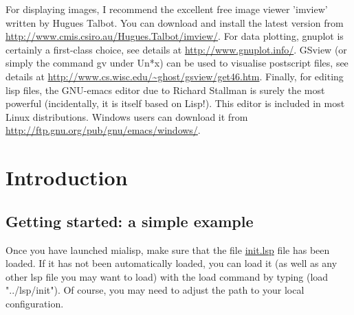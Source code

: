\documentclass{book}
\renewcommand{\htmladdnormallink}[2]{\href{#2}{#1}}
\begin{document}
For displaying images, I recommend the excellent free image viewer 'imview' written by Hugues Talbot.  You can download and install the latest version from \htmladdnormallink{\url{http://www.cmis.csiro.au/Hugues.Talbot/imview/}}{http://www.cmis.csiro.au/Hugues.Talbot/imview/}.  For data plotting, gnuplot is certainly a first-class choice, see details at \htmladdnormallink{\url{http://www.gnuplot.info/}}{http://www.gnuplot.info/}.  GSview (or simply the command gv under Un*x) can be used to visualise postscript files, see details at \htmladdnormallink{\url{http://www.cs.wisc.edu/~ghost/gsview/get46.htm}}{http://www.cs.wisc.edu/~ghost/gsview/get46.htm}.  Finally, for editing lisp files, the GNU-emacs editor due to Richard Stallman is surely the most powerful (incidentally, it is itself based on Lisp!).  This editor is included in most Linux distributions.  Windows users can download it from \htmladdnormallink{\url{http://ftp.gnu.org/pub/gnu/emacs/windows/}}{http://www.gnu.org/software/emacs/windows/ntemacs.html}.



\chapter{Introduction}

\section{Getting started: a simple example}
Once you have launched mialisp, make sure that the file \htmladdnormallink{init.lsp}{../lsp/init.lsp} file has been loaded.  If it has not been automatically loaded, you can load it (as well as any other lsp file you may want to load) with the load command by typing (load "../lsp/init").  Of course, you may need to adjust the path to your local configuration.
\end{document}
